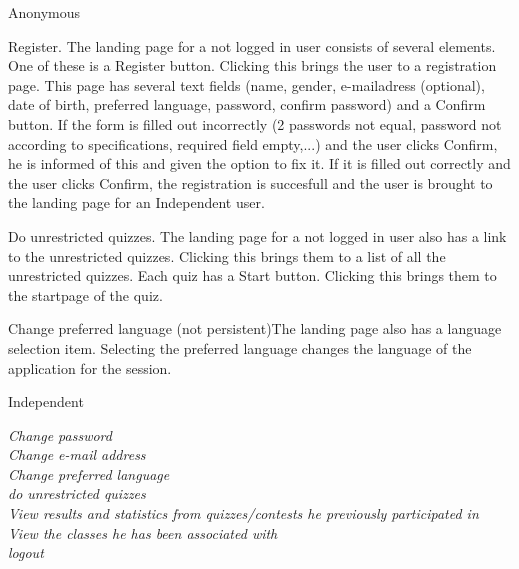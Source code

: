\begin{section}{Anonymous}


    \begin{subsection}{Register.} The landing page for a not logged in user consists of several elements. One of these is a Register button. Clicking this brings the user to a registration page. This page has several text fields (name, gender, e-mailadress (optional), date of birth, preferred language, password, confirm password) and a Confirm button. If the form is filled out incorrectly (2 passwords not equal, password not according to specifications, required field empty,...) and the user clicks Confirm, he is informed of this and given the option to fix it. If it is filled out correctly and the user clicks Confirm, the registration is succesfull and the user is brought to the landing page for an Independent user.\end{subsection}
	\begin{subsection}{Do unrestricted quizzes.} The landing page for a not logged in user also has a link to the unrestricted quizzes. Clicking this brings them to a list of all the unrestricted quizzes. Each quiz has a Start button. Clicking this brings them to the startpage of the quiz.\end{subsection}
    \begin{subsection}{Change preferred language (not persistent)}The landing page also has a language selection item. Selecting the preferred language changes the language of the application for the session.\end{subsection}


\end{section}
\begin{section}{Independent}

    \textit{Change password}\\
    \textit{Change e-mail address}\\
    \textit{Change preferred language}\\
    \textit{do unrestricted quizzes}\\
    \textit{View results and statistics from quizzes/contests he previously participated in}\\
    \textit{View the classes he has been associated with}\\
    \textit{logout}\\
    
    \end{section}
    

